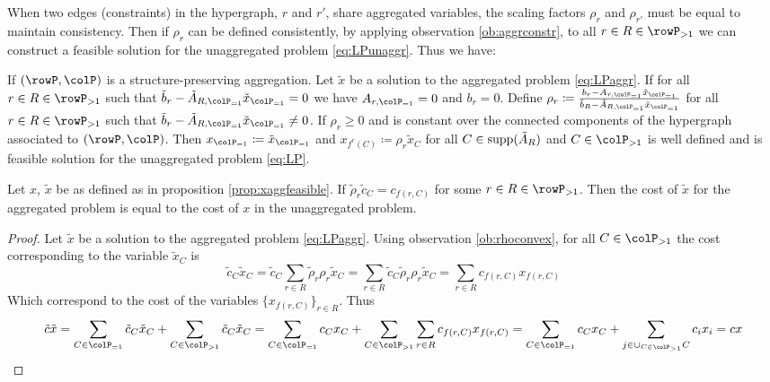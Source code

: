 {When two edges (constraints) in the hypergraph, \(r\) and \(r'\), share aggregated variables, the scaling factors \(\rho_r\) and \(\rho_{r'}\) must be equal to maintain consistency. 
Then if \(\rho_r\) can be defined consistently, by applying observation \ref{ob:aggrconstr}, to all \(r \in R \in \rowP_{>1}\) we can construct a feasible solution for the unaggregated problem \eqref{eq:LPunaggr}. Thus we have: 
\begin{proposition}
\label{prop:xaggfeasible}
If \((\rowP, \colP)\) is a structure-preserving aggregation. Let \(\tilde{x}\) be a solution 
to the aggregated problem \eqref{eq:LPaggr}. If for all \(r \in R \in \rowP_{>1}\) such that  \(\tilde{b}_r - \tilde{A}_{R, \colP_{=1}} \tilde{x}_{\colP_{=1}} = 0\) we have \(A_{r,\colP_{=1}} = 0\) and \(b_r=0\).
Define \(\rho_r \coloneqq \frac{b_r - A_{r, \colP_{=1}} \tilde{x}_{\colP_{=1}}}{\tilde{b}_R - \tilde{A}_{R, \colP_{=1}} \tilde{x}_{\colP_{=1}}}\) for all \(r \in R \in \rowP_{>1}\) such that   \(\tilde{b}_r - \tilde{A}_{R, \colP_{=1}} \tilde{x}_{\colP_{=1}} \neq 0\). If \(\rho_r \geq 0\) and is constant over the connected components of the hypergraph associated to \((\rowP, \colP)\). 
Then \(x_{\colP_{=1}} \coloneqq \tilde{x}_{\colP_{=1}}\) and \(x_{f^r(C)} \coloneqq \rho_r \tilde{x}_C\) for all \(C \in \operatorname{supp}(\tilde{A}_R)\) and \(C \in \colP_{>1}\) is well defined and is feasible solution for the unaggregated problem \eqref{eq:LP}.
\end{proposition}


\begin{observation}
  \label{ob:costpreserving}
  Let \(x\), \(\tilde{x}\) be as defined as in proposition \ref{prop:xaggfeasible}. If \(\tilde{\rho}_r\tilde{c}_C = c_{f(r,C)}\) for some \(r \in R \in \rowP_{>1}\). Then the cost of \(\tilde{x}\) for the aggregated problem 
  is equal to the cost of \(x\) in the unaggregated problem. 
\end{observation}
\begin{proof}
  Let \(\tilde{x}\) be a solution to the aggregated problem \eqref{eq:LPaggr}. Using observation \ref{ob:rhoconvex}, for all \(C \in \colP_{>1}\) the cost corresponding to the variable \(\tilde{x}_C\) is 
  \[
  \tilde{c}_C\tilde{x}_C = \tilde{c}_C\sum_{r \in R}\tilde{\rho}_r\rho_r\tilde{x}_C = \sum_{r \in R}\tilde{c}_C\tilde{\rho}_r\rho_r\tilde{x}_C  = \sum_{r \in R}c_{f(r,C)}x_{f(r,C)}
  \]
  Which correspond to the cost of the variables \(\{x_{f(r,C)}\}_{r \in R}\). Thus
  \[
  \tilde{c}\tilde{x} = \sum_{C \in \colP_{=1}}\tilde{c}_C\tilde{x}_C + \sum_{C \in \colP_{>1}}\tilde{c}_C\tilde{x}_C = \sum_{C \in \colP_{=1}}c_Cx_C + \sum_{C \in \colP_{>1}}\sum_{r \in R}c_{f(r,C)}x_{f(r,C)} =  \sum_{C \in \colP_{=1}}c_Cx_C + \sum_{j \in \cup_{C \in \colP_{>1}}C}c_{i}x_{i} =  cx
  \]


\end{proof}}
